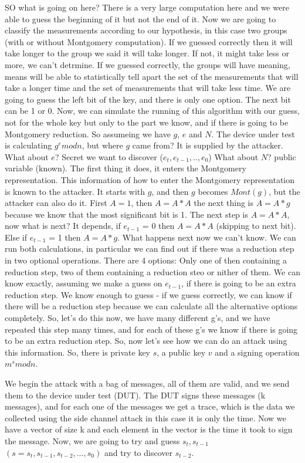 SO what is going on here? There is a very large computation here and we were able
to guess the beginning of it but not the end of it. Now we are going to classify
the measurements according to our hypothesis, in this case two groups (with or
without Montgomery computation). If we guessed correctly then it will take
longer to the group we said it will take longer. If not, it might take less or
more, we can't detrmine. If we guessed correctly, the groups will have meaning,
means will be able to statistically tell apart the set of the measurements
that will take a longer time and the set of measurements that will take less
time. We are going to guess the left bit of the key, and there is only one option.
The next bit can be 1 or 0. Now, we can
simulate the running of this algorithm with our guess, not for the whole key but only
to the part we know, and if there is going to be Montgomery reduction. So assumeing we
have $g$, $e$ and $N$. The device under test is calculating \(g^emodn\), but where $g$ came
from? It is supplied by the attacker. What about $e$? Secret we want to discover
(\(e_t,e_{t-1},..,e_0\)) What about $N$? public variable (known). The first
thing it does, it enters the Montgomery representation. This information of how
to enter the Montgomery representation is known to the attacker. It starts with
$g$, and then $g$ becomes $Mont(g)$, but the attacker can also do it. First \(A=1\), then
\(A=A*A\) the next thing is \(A=A*g\) because we know that the most significant
bit is 1. The next step is \(A=A*A\), now what is next? It depends, if
\(e_{t-1}\) = 0 then \(A=A*A\) (skipping to next bit). Else if \(e_{t-1}\) = 1
then \(A=A*g\). What happens next now we can't know. We can run both
calculations, in particular we can find out if there was a reduction step in two
optional operations. There are 4 options: Only one of then containing a reduction step,
two of them containing a reduction steo or nither of them. We can know exactly, 
assuming we make a guess on \(e_{t-1}\),
if there is going to be an extra reduction step. We know enough to guess - if we
guess correctly, we can know if there will be a reduction step because we can
calculate all the alternative options completely. So, let's do this now, we have
many different g's, and we have repeated this step many times, and for each of these
g's we know if there is going to be an extra reduction step. So, now let's see
how we can do an attack using this information. So, there is private key $s$, 
a public key $v$ and a signing operation \(m^s mod n\). 

We begin the attack with a bag of messages, all of them are valid, and we send
them to the device under test (DUT). The DUT signs these messages (k messages),
and for each one of the messages we get a trace, which is the data we collected
using the side channel attack in this case it is only the time. Now we have a
vector of size k and each element in the vector is the time it took to sign the
message. Now, we are going to try and guess \(s_t,s_{t-1}\) \((s =
s_t,s_{t-1},s_{t-2},…,s_0)\) and try to discover \(s_{t-2}\). 

